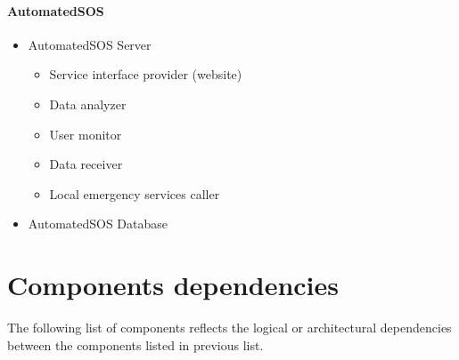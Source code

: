 		\paragraph{AutomatedSOS}
		\begin{itemize}
			\item{AutomatedSOS Server}
				\begin{itemize}
					\item{Service interface provider (website)}
					\item{Data analyzer}
					\item{User monitor}
					\item{Data receiver}
					\item{Local emergency services caller}
				\end{itemize}
			\item{AutomatedSOS Database}
		\end{itemize}

	\section{Components dependencies}
		The following list of components reflects the logical or architectural dependencies between the components listed in previous list.
